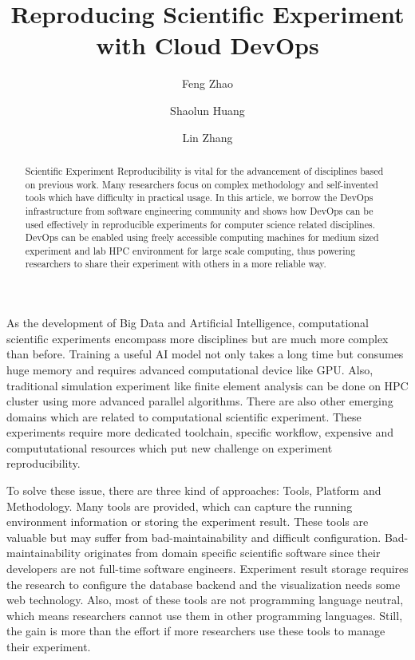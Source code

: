 \documentclass{IEEEcsmag}
\begin{document}

\title{Reproducing Scientific Experiment with Cloud DevOps}

\author{Feng Zhao}

\author{Shaolun Huang}

\author{Lin Zhang}


\begin{abstract}
Scientific Experiment Reproducibility is vital for the advancement of disciplines based on previous work. Many researchers focus on complex methodology and self-invented tools which have difficulty in practical usage. In this article, we borrow the DevOps infrastructure from software engineering community and shows how DevOps can be used effectively in reproducible experiments for computer science related disciplines. DevOps can be enabled using freely accessible computing machines for medium sized experiment and lab HPC environment for large scale computing, thus powering researchers to share their experiment with others in a more reliable way.
\end{abstract}

\maketitle

 As the development of Big Data and Artificial Intelligence, computational scientific experiments encompass more disciplines but are much more complex than before. Training a useful AI model not only takes a long time but consumes huge memory and requires advanced computational device like GPU. Also, traditional simulation experiment like finite element analysis can be done on HPC cluster using more advanced parallel algorithms. There are also other emerging domains which are related to computational scientific experiment. These experiments require more dedicated toolchain, specific workflow, expensive and compututational resources which put new challenge on experiment reproducibility.

To solve these issue, there are three kind of approaches: Tools, Platform and Methodology. Many tools \cite{greff2017sacred} are provided, which can capture the running environment information or storing the experiment result. These tools are valuable but may suffer from bad-maintainability and difficult configuration. Bad-maintainability originates from domain specific scientific software since their developers are not full-time software engineers. Experiment result storage requires the research to configure the database backend and the visualization needs some web technology. Also, most of these tools are not programming language neutral, which means researchers cannot use them in other programming languages. Still, the gain is more than the effort if more researchers use these tools to manage their experiment.
\end{document}
